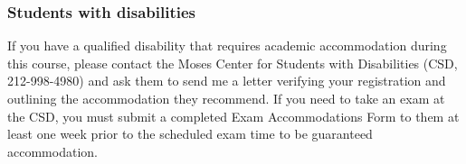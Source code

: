 \documentclass[12pt,pdftex,twoside,letterpaper]{exam}
\begin{document}
\subsubsection*{Students with disabilities}

  If you have a qualified disability that requires academic accommodation during this course,
  please contact the Moses Center for Students with Disabilities (CSD, 212-998-4980) and ask them
  to send me a letter verifying your registration and outlining the accommodation they recommend.
  If you need to take an exam at the CSD, you must submit a completed Exam Accommodations Form to
  them at least one week prior to the scheduled exam time to be guaranteed accommodation.
\end{document}
